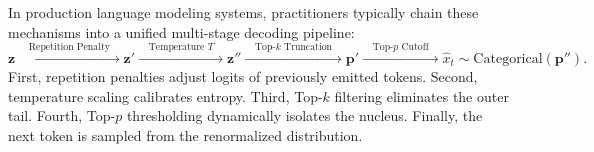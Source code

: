 \documentclass[../../main.tex]{subfiles}
\begin{document}
In production language modeling systems, practitioners typically chain these mechanisms into a unified multi-stage decoding pipeline:
\begin{equation}
\mathbf{z} \xrightarrow{\quad \text{Repetition Penalty} \quad} \mathbf{z}' \xrightarrow{\quad \text{Temperature } T \quad} \mathbf{z}'' \xrightarrow{\quad \text{Top-}k \text{ Truncation} \quad} \mathbf{p}' \xrightarrow{\quad \text{Top-}p \text{ Cutoff} \quad} \hat{x}_t \sim \text{Categorical}(\mathbf{p}'').
\label{eq:decoding_pipeline_stages}
\end{equation}
First, repetition penalties adjust logits of previously emitted tokens. Second, temperature scaling calibrates entropy. Third, Top-$k$ filtering eliminates the outer tail. Fourth, Top-$p$ thresholding dynamically isolates the nucleus. Finally, the next token is sampled from the renormalized distribution.
\end{document}
